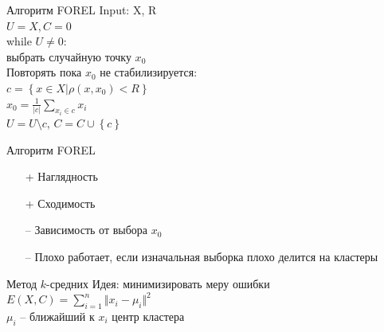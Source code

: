 \documentclass[10pt]{beamer}
\begin{document}
\begin{frame}{Алгоритм FOREL}
	Input: X, R\\
	${U = X, C = 0}$\\\vspace{2mm}
	while ${U \neq 0}$:\\
	\hspace{5mm} выбрать случайную точку $x_0$\\
	\vspace{2mm}
	\hspace{5mm} Повторять пока $x_0$ не стабилизируется:\\
	\vspace{2mm}
	\hspace{10mm} ${c = \left\{ x \in X \vert \rho(x, x_0) < R \right\}}$ \\
	\vspace{2mm}
	\hspace{10mm} $x_0 = \frac{1}{\vert c \vert} \sum\limits_{x_i \in c} x_i$\\
	\vspace{2mm}
	\hspace{5mm} ${U = U \setminus c}$, ${C = C \cup \left\{ c \right\}}$
\end{frame}

\begin{frame}{Алгоритм FOREL}
	\begin{itemize} [<+- | alert@+>]
		\item[+] Наглядность
		\item[+] Сходимость
		\bigbreak
		\item[--] Зависимость от выбора $x_0$
		\item[--] Плохо работает, если изначальная выборка плохо делится на кластеры
	\end{itemize}
\end{frame}


\begin{frame}{Метод $k$-средних}
	\alert{Идея}:  минимизировать меру ошибки\\
	\bigbreak
	${E(X, C) = \sum\limits_{i = 1}^n \Vert x_i -\mu_i \Vert^2}$\\
	\bigbreak
	$\mu_i$ -- ближайший к $x_i$ центр кластера
\end{frame}
\end{document}
